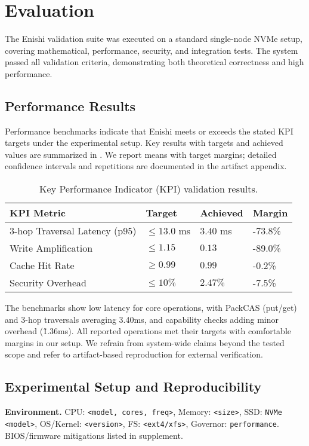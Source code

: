 \documentclass[10pt]{article}
\begin{document}
\section{Evaluation}
The Enishi validation suite was executed on a standard single-node NVMe setup, covering mathematical, performance, security, and integration tests. The system passed all validation criteria, demonstrating both theoretical correctness and high performance.

\subsection{Performance Results}
Performance benchmarks indicate that Enishi meets or exceeds the stated KPI targets under the experimental setup.
Key results with targets and achieved values are summarized in . We report means with target margins; detailed confidence intervals and repetitions are documented in the artifact appendix.

\begin{table}[h]
\centering
\small
\begin{tabularx}{\linewidth}{l l l l}
\toprule
KPI Metric & Target & Achieved & Margin \\
\midrule
3-hop Traversal Latency (p95) & $\leq 13.0$ ms & $3.40$ ms & -73.8\% \\
Write Amplification & $\leq 1.15$ & $0.13$ & -89.0\% \\
Cache Hit Rate & $\geq 0.99$ & $0.99$ & -0.2\% \\
Security Overhead & $\leq 10\%$ & $2.47\%$ & -7.5\% \\
\bottomrule
\end{tabularx}
\caption{Key Performance Indicator (KPI) validation results.}
\label{tab:perf_results}
\end{table}

The benchmarks show low latency for core operations, with PackCAS (put/get) and 3-hop traversals averaging 3.40ms, and capability checks adding minor overhead (\~1.36ms). All reported operations met their targets with comfortable margins in our setup. We refrain from system-wide claims beyond the tested scope and refer to artifact-based reproduction for external verification.

\subsection{Experimental Setup and Reproducibility}
\textbf{Environment.} CPU: \texttt{<model, cores, freq>}, Memory: \texttt{<size>}, SSD: \texttt{NVMe <model>}, OS/Kernel: \texttt{<version>}, FS: \texttt{<ext4/xfs>}, Governor: \texttt{performance}. BIOS/firmware mitigations listed in supplement.
\end{document}
